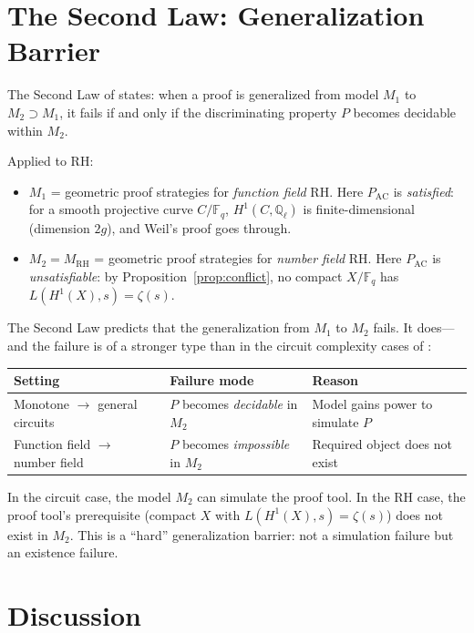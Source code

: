 \documentclass[12pt]{article}
\newcommand{\FF}{\mathbb{F}}
\newcommand{\Ql}{\mathbb{Q}_\ell}
\newcommand{\MRH}{M_{\mathrm{RH}}}
\newcommand{\PAC}{P_{\mathrm{AC}}}
\begin{document}
\section{The Second Law: Generalization Barrier}
\label{sec:second}

The Second Law of \cite{metamethod2026} states: when a proof is
generalized from model $M_1$ to $M_2 \supset M_1$, it fails if and
only if the discriminating property $P$ becomes decidable within $M_2$.

Applied to RH:

\begin{itemize}
\item $M_1$ = geometric proof strategies for \emph{function field} RH.
  Here $\PAC$ is \emph{satisfied}: for a smooth projective curve
  $C/\FF_q$, $H^1(C, \Ql)$ is finite-dimensional (dimension $2g$),
  and Weil's proof \cite{weil1948} goes through.

\item $M_2 = \MRH$ = geometric proof strategies for \emph{number field}
  RH. Here $\PAC$ is \emph{unsatisfiable}: by
  Proposition~\ref{prop:conflict}, no compact $X/\FF_q$ has
  $L(H^1(X),s) = \zeta(s)$.
\end{itemize}

The Second Law predicts that the generalization from $M_1$ to $M_2$
fails. It does---and the failure is of a stronger type than in the
circuit complexity cases of \cite{metamethod2026}:

\begin{center}
\begin{tabular}{lll}
\toprule
Setting & Failure mode & Reason \\
\midrule
Monotone $\to$ general circuits & $P$ becomes \emph{decidable} in $M_2$
  & Model gains power to simulate $P$ \\
Function field $\to$ number field & $P$ becomes \emph{impossible} in $M_2$
  & Required object does not exist \\
\bottomrule
\end{tabular}
\end{center}

In the circuit case, the model $M_2$ can simulate the proof tool.
In the RH case, the proof tool's prerequisite (compact $X$ with
$L(H^1(X),s) = \zeta(s)$) does not exist in $M_2$. This is a
``hard'' generalization barrier: not a simulation failure but an
existence failure.

\section{Discussion}
\label{sec:discussion}
\end{document}
